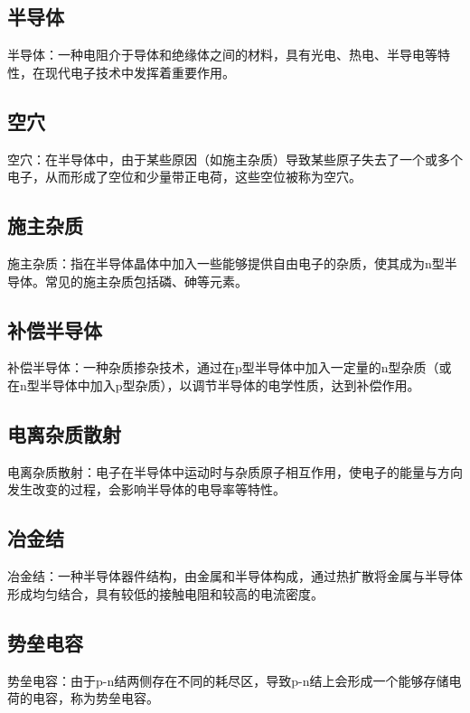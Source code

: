 \documentclass{report}          %
\begin{document}
\subsection{半导体}

半导体：一种电阻介于导体和绝缘体之间的材料，具有光电、热电、半导电等特性，在现代电子技术中发挥着重要作用。

\subsection{空穴}

空穴：在半导体中，由于某些原因（如施主杂质）导致某些原子失去了一个或多个电子，从而形成了空位和少量带正电荷，这些空位被称为空穴。

\subsection{施主杂质}

施主杂质：指在半导体晶体中加入一些能够提供自由电子的杂质，使其成为n型半导体。常见的施主杂质包括磷、砷等元素。

\subsection{补偿半导体}

补偿半导体：一种杂质掺杂技术，通过在p型半导体中加入一定量的n型杂质（或在n型半导体中加入p型杂质），以调节半导体的电学性质，达到补偿作用。

\subsection{电离杂质散射}

电离杂质散射：电子在半导体中运动时与杂质原子相互作用，使电子的能量与方向发生改变的过程，会影响半导体的电导率等特性。

\subsection{冶金结}

冶金结：一种半导体器件结构，由金属和半导体构成，通过热扩散将金属与半导体形成均匀结合，具有较低的接触电阻和较高的电流密度。

\subsection{势垒电容}

势垒电容：由于p-n结两侧存在不同的耗尽区，导致p-n结上会形成一个能够存储电荷的电容，称为势垒电容。
\end{document}
